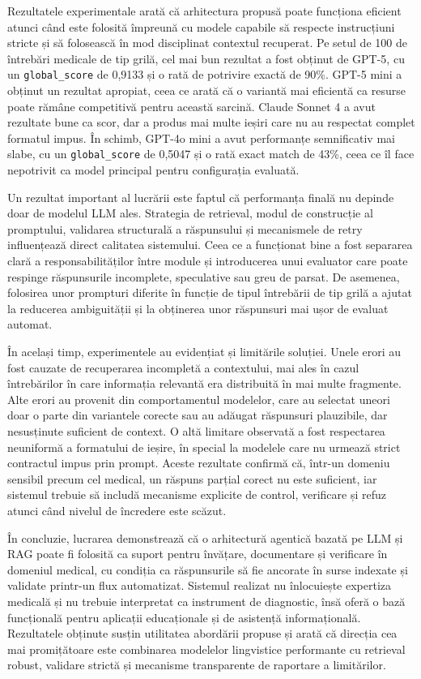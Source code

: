 \documentclass[12pt, a4paper, oneside, romanian]{teza-upb}
\begin{document}
Rezultatele experimentale arată că arhitectura propusă poate funcționa eficient atunci când este folosită împreună cu modele capabile să respecte instrucțiuni stricte și să folosească în mod disciplinat contextul recuperat. Pe setul de 100 de întrebări medicale de tip grilă, cel mai bun rezultat a fost obținut de GPT-5, cu un \texttt{global\_score} de 0,9133 și o rată de potrivire exactă de 90\%. GPT-5 mini a obținut un rezultat apropiat, ceea ce arată că o variantă mai eficientă ca resurse poate rămâne competitivă pentru această sarcină. Claude Sonnet 4 a avut rezultate bune ca scor, dar a produs mai multe ieșiri care nu au respectat complet formatul impus. În schimb, GPT-4o mini a avut performanțe semnificativ mai slabe, cu un \texttt{global\_score} de 0,5047 și o rată exact match de 43\%, ceea ce îl face nepotrivit ca model principal pentru configurația evaluată.

Un rezultat important al lucrării este faptul că performanța finală nu depinde doar de modelul LLM ales. Strategia de retrieval, modul de construcție al promptului, validarea structurală a răspunsului și mecanismele de retry influențează direct calitatea sistemului. Ceea ce a funcționat bine a fost separarea clară a responsabilităților între module și introducerea unui evaluator care poate respinge răspunsurile incomplete, speculative sau greu de parsat. De asemenea, folosirea unor prompturi diferite în funcție de tipul întrebării de tip grilă a ajutat la reducerea ambiguității și la obținerea unor răspunsuri mai ușor de evaluat automat.

În același timp, experimentele au evidențiat și limitările soluției. Unele erori au fost cauzate de recuperarea incompletă a contextului, mai ales în cazul întrebărilor în care informația relevantă era distribuită în mai multe fragmente. Alte erori au provenit din comportamentul modelelor, care au selectat uneori doar o parte din variantele corecte sau au adăugat răspunsuri plauzibile, dar nesusținute suficient de context. O altă limitare observată a fost respectarea neuniformă a formatului de ieșire, în special la modelele care nu urmează strict contractul impus prin prompt. Aceste rezultate confirmă că, într-un domeniu sensibil precum cel medical, un răspuns parțial corect nu este suficient, iar sistemul trebuie să includă mecanisme explicite de control, verificare și refuz atunci când nivelul de încredere este scăzut.

În concluzie, lucrarea demonstrează că o arhitectură agentică bazată pe LLM și RAG poate fi folosită ca suport pentru învățare, documentare și verificare în domeniul medical, cu condiția ca răspunsurile să fie ancorate în surse indexate și validate printr-un flux automatizat. Sistemul realizat nu înlocuiește expertiza medicală și nu trebuie interpretat ca instrument de diagnostic, însă oferă o bază funcțională pentru aplicații educaționale și de asistență informațională. Rezultatele obținute susțin utilitatea abordării propuse și arată că direcția cea mai promițătoare este combinarea modelelor lingvistice performante cu retrieval robust, validare strictă și mecanisme transparente de raportare a limitărilor.
\end{document}
